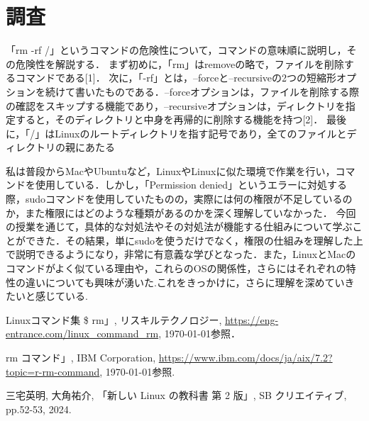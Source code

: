 \documentclass{myreport}  %
\begin{document}
\section{調査}
「rm -rf /」というコマンドの危険性について，コマンドの意味順に説明し，その危険性を解説する．
まず初めに，「rm」はremoveの略で，ファイルを削除するコマンドである[1]．
次に，「-rf」とは，--forceと--recursiveの2つの短縮形オプションを続けて書いたものである．--forceオプションは，ファイルを削除する際の確認をスキップする機能であり，--recursiveオプションは，ディレクトリを指定すると，そのディレクトリと中身を再帰的に削除する機能を持つ[2]．
最後に，「/」はLinuxのルートディレクトリを指す記号であり，全てのファイルとディレクトリの親にあたる

私は普段からMacやUbuntuなど，LinuxやLinuxに似た環境で作業を行い，コマンドを使用している．しかし，「Permission denied」というエラーに対処する際，sudoコマンドを使用していたものの，実際には何の権限が不足しているのか，また権限にはどのような種類があるのかを深く理解していなかった．
今回の授業を通じて，具体的な対処法やその対処法が機能する仕組みについて学ぶことができた．その結果，単にsudoを使うだけでなく，権限の仕組みを理解した上で説明できるようになり，非常に有意義な学びとなった．また，LinuxとMacのコマンドがよく似ている理由や，これらのOSの関係性，さらにはそれぞれの特性の違いについても興味が湧いた.これをきっかけに，さらに理解を深めていきたいと感じている.

\begin{thebibliography}{9}
      \item Linuxコマンド集 \$ rm」, リスキルテクノロジー, \url{https://eng-entrance.com/linux_command_rm}, \today 参照．
      \item rm コマンド」, IBM Corporation, \url{https://www.ibm.com/docs/ja/aix/7.2?topic=r-rm-command}, \today 参照.
      \item 三宅英明, 大角祐介, 「新しい Linux の教科書 第 2 版」, SB クリエイティブ, pp.52-53, 2024.
\end{thebibliography}
\end{document}
